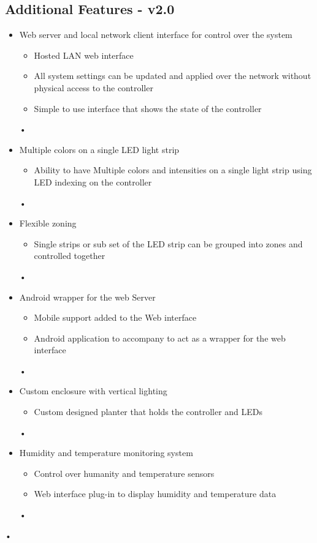 \documentclass[letterpaper,10pt,draftclsnofoot,onecolumn]{article}
\begin{document}
	\subsection*{Additional Features - v2.0}
	\begin{itemize}
		\item Web server and local network client interface for control over the system
			\begin{itemize}
				\item Hosted LAN web interface
				\item All system settings can be updated and applied over the network without physical access to the controller
				\item Simple to use interface that shows the state of the controller
			\end{itemize}•
		\item Multiple colors on a single LED light strip
			\begin{itemize}
				\item Ability to have Multiple colors and intensities on a single light strip using LED indexing on the controller
			\end{itemize}•
		\item  Flexible zoning
			\begin{itemize}
				\item Single strips or sub set of the LED strip can be grouped into zones and controlled together
			\end{itemize}•
		\item Android wrapper for the web Server
			\begin{itemize}
				\item Mobile support added to the Web interface
				\item Android application to accompany to act as a wrapper for the web interface
			\end{itemize}•
		\item Custom enclosure with vertical lighting
			\begin{itemize}
				\item Custom designed planter that holds the  controller and LEDs
			\end{itemize}•
		\item Humidity and temperature monitoring system
			\begin{itemize}
				\item Control over humanity and temperature sensors
				\item Web interface plug-in to display humidity and temperature data
			\end{itemize}•
	\end{itemize}•
\end{document}
